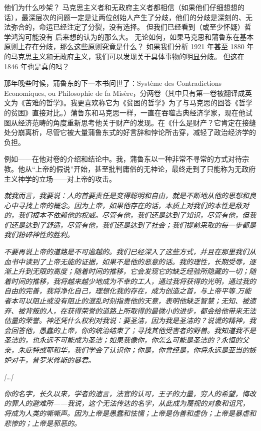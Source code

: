 \documentclass[DIV=12,%
               BCOR=0mm,%
               headinclude=false,%
               footinclude=false,open=any,%
               fontsize=10pt,%
               oneside,%
               paper=210mm:11in]%
               {scrbook}
\begin{document}
他们为什么吵架？ 马克思主义者和无政府主义者都相信（如果他们仔细想想的话），最深层次的问题一定是让两位创始人产生了分歧，他们的分歧是深刻的、无法弥合的，命运已经注定了分裂，没有选择。 但我们已经看到（或至少怀疑）哲学鸿沟可能没有 后来想的认为的那么大。 无论如何，如果马克思和蒲鲁东在基本原则上存在分歧，那么这些原则究竟是什么？ 如果我们分析 1921 年甚至 1880 年的马克思主义和无政府主义，我们可以发现关于具体事物的明显分歧。 但这在 1846 年也是真的吗？


那年晚些时候，蒲鲁东的下一本书问世了：Système des Contradictions Economiques, ou Philosophie de fa Misère，分两卷（其中只有第一卷被翻译成英文为《苦难的哲学》。我更喜欢称它为《贫困的哲学》为了与马克思的回答《哲学的贫困》直接对比。）蒲鲁东和马克思一样，一直在吞噬古典经济学家，现在他试图从经济范畴的角度重新思考他关于财产的发现。在《什么是财产？它肯定在接缝处分崩离析，尽管它被大量蒲鲁东式的好言辞和悖论所击穿，减轻了政治经济学的负担。


例如——在他对卷的介绍和结论中。我，蒲鲁东以一种非常不寻常的方式对待宗教。他从“上帝的假说”开始，甚至批判庸俗的无神论，最终走到了只能称为无政府主义神学的立场——对上帝的攻击。


\emph{就我而言，我要说：人的首要责任是变得聪明和自由，就是不断地从他的思想和良心中寻找上帝的概念。因为上帝，如果他存在的话，本质上对我们的本性是敌对的，我们根本不依赖他的权威。尽管有他，我们还是达到了知识，尽管有他，但我们还是达到了舒适，尽管有他，我们还是达到了社会；我们提前采取的每一步都是我们粉碎神性的胜利。}


\emph{不要再说上帝的道路是不可逾越的。我们已经深入了这些方式，并且在那里我们从血书中读到了上帝无能的证据，如果不是他的恶意的话。我的理性，长期受辱，逐渐上升到无限的高度；随着时间的推移，它会发现它的缺乏经验所隐藏的一切；随着时间的推移，我将越来越少地成为不幸的工人，通过我将获得的光明，通过我的自由的完善，我将净化自己，理想化我的存在，成为创造之首，与上帝平等.万能者本可以阻止或没有阻止的混乱时刻指责他的天意，表明他缺乏智慧；无知、被遗弃、被背叛的人，在获得荣誉的道路上所取得的最微小的进步，都会给他带来无法估量的荣誉。神还凭什么权利对我说：要圣洁，因为我是圣洁的？说谎的精神，我会回答他，愚蠢的上帝，你的统治结束了；寻找其他受害者的野兽。我知道我不是圣洁的，也永远不可能成为圣洁；如果我像你，你怎么可能是圣洁的？永恒的父亲，朱庇特或耶和华，我们学会了认识你；你是，你曾经是，你将永远是亚当的嫉妒对手，普罗米修斯的暴君。}


\emph{[\dots{}]}


\emph{你的名字，长久以来，学者的遗言，法官的认可，王子的力量，穷人的希望，悔改的罪人的避难所——我说，这个无法传达的名字，从此成为蔑视的对象和诅咒，将成为人类的嘶嘶声。因为上帝是愚蠢和怯懦；上帝是伪善和虚伪；上帝是暴虐和悲惨的；上帝是邪恶的。}
\end{document}
